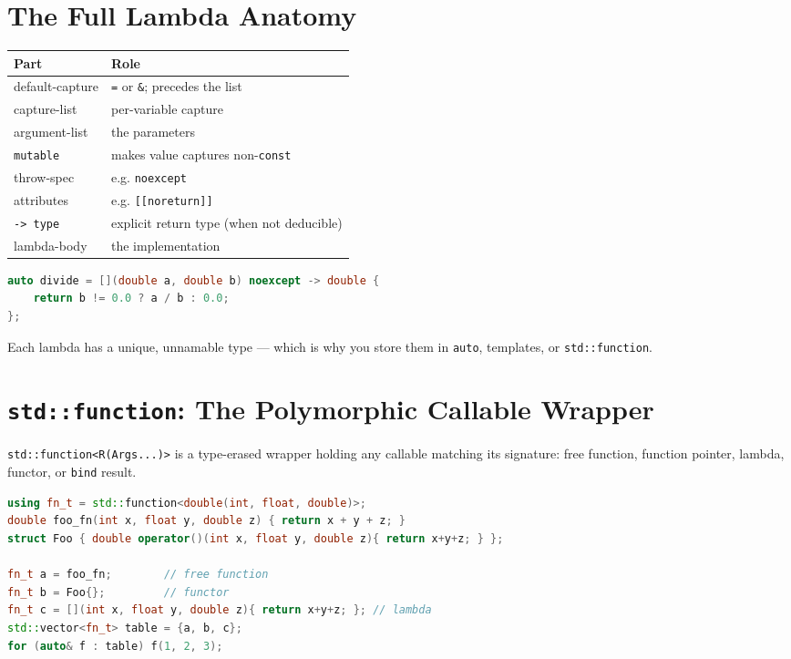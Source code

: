 \section{The Full Lambda Anatomy}

\begin{center}
\begin{tabular}{|l|l|}
\hline \textbf{Part} & \textbf{Role} \\ \hline
default-capture     & \texttt{=} or \texttt{\&}; precedes the list \\
capture-list        & per-variable capture \\
argument-list       & the parameters \\
\texttt{mutable}    & makes value captures non-\texttt{const} \\
throw-spec          & e.g. \texttt{noexcept} \\
attributes          & e.g. \texttt{[[noreturn]]} \\
\texttt{-> type}    & explicit return type (when not deducible) \\
lambda-body         & the implementation \\
\hline
\end{tabular}
\end{center}

\begin{lstlisting}[language=C++, caption={explicit return type and noexcept}]
auto divide = [](double a, double b) noexcept -> double {
    return b != 0.0 ? a / b : 0.0;
};
\end{lstlisting}

Each lambda has a unique, unnamable type --- which is why you store them in \texttt{auto}, templates, or \texttt{std::function}.

\section{\texttt{std::function}: The Polymorphic Callable Wrapper}

\texttt{std::function<R(Args...)>} is a type-erased wrapper holding any callable matching its signature: free function, function pointer, lambda, functor, or \texttt{bind} result.

\begin{lstlisting}[language=C++, caption={one type, many callables}]
using fn_t = std::function<double(int, float, double)>;
double foo_fn(int x, float y, double z) { return x + y + z; }
struct Foo { double operator()(int x, float y, double z){ return x+y+z; } };

fn_t a = foo_fn;        // free function
fn_t b = Foo{};         // functor
fn_t c = [](int x, float y, double z){ return x+y+z; }; // lambda
std::vector<fn_t> table = {a, b, c};
for (auto& f : table) f(1, 2, 3);
\end{lstlisting}

